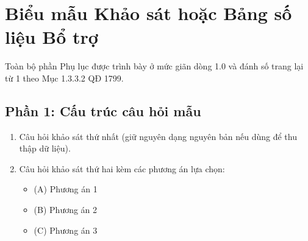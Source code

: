 
\chapter{Biểu mẫu Khảo sát hoặc Bảng số liệu Bổ trợ}\label{app:bieu_mau}

Toàn bộ phần Phụ lục được trình bày ở mức giãn dòng 1.0 và đánh số trang lại từ 1 theo Mục 1.3.3.2 QĐ 1799.

\section*{Phần 1: Cấu trúc câu hỏi mẫu}
\begin{enumerate}[leftmargin=*]
  \item Câu hỏi khảo sát thứ nhất (giữ nguyên dạng nguyên bản nếu dùng để thu thập dữ liệu).
  \item Câu hỏi khảo sát thứ hai kèm các phương án lựa chọn:
  \begin{itemize}
    \item (A) Phương án 1
    \item (B) Phương án 2
    \item (C) Phương án 3
  \end{itemize}
\end{enumerate}
